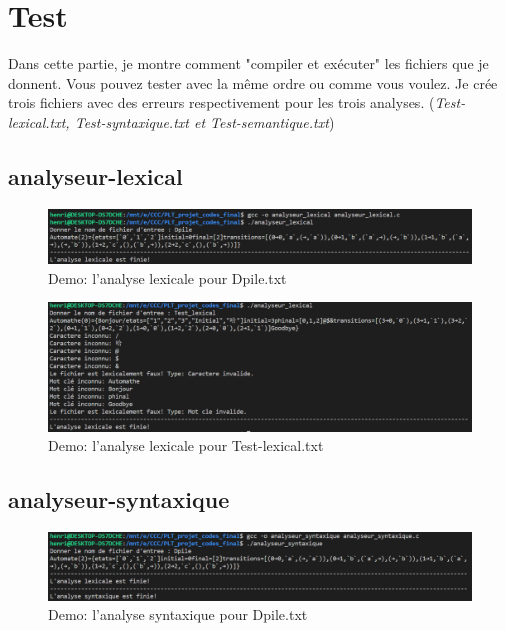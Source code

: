 \documentclass[a4paper,14pt,UTF8]{article}
\begin{document}
	\section{Test}
	\quad Dans cette partie, je montre comment "compiler et exécuter" les fichiers que je donnent. Vous pouvez tester avec la même ordre ou comme vous voulez. Je crée trois fichiers avec des erreurs respectivement pour les
	trois analyses. (\textit{Test-lexical.txt, Test-syntaxique.txt et Test-semantique.txt})
	
	\subsection{analyseur-lexical}

	\begin{figure}[H]
		\setlength{\abovecaptionskip}{-0.cm}
		
		\begin{center}
			\includegraphics[width=16cm]{lexical1}
		\end{center}
		\caption{Demo: l'analyse lexicale pour Dpile.txt}
	\end{figure}

	\begin{figure}[H]
	\setlength{\abovecaptionskip}{-0.cm}
	
	\begin{center}
		\includegraphics[width=16cm]{lexical2}
	\end{center}
	\caption{Demo: l'analyse lexicale pour Test-lexical.txt}
	\end{figure}

	\subsection{analyseur-syntaxique}
	
	\begin{figure}[H]
		\setlength{\abovecaptionskip}{-0.cm}
		
		\begin{center}
			\includegraphics[width=16cm]{syntaxique1}
		\end{center}
		\caption{Demo: l'analyse syntaxique pour Dpile.txt}
	\end{figure}
\end{document}
